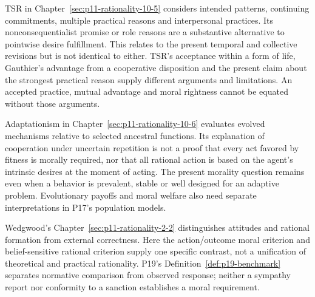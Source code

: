 TSR in Chapter~\ref{sec:p11-rationality-10-5} considers intended
patterns, continuing commitments, multiple practical reasons and
interpersonal practices. Its nonconsequentialist promise or role
reasons are a substantive alternative to pointwise desire fulfillment.
This relates to the present temporal and collective revisions but
is not identical to either. TSR's acceptance within a form of life,
Gauthier's advantage from a cooperative disposition and the present
claim about the strongest practical reason supply different
arguments and limitations. An accepted practice, mutual advantage
and moral rightness cannot be equated without those arguments.

Adaptationism in Chapter~\ref{sec:p11-rationality-10-6} evaluates
evolved mechanisms relative to selected ancestral functions. Its
explanation of cooperation under uncertain repetition is not a
proof that every act favored by fitness is morally required, nor
that all rational action is based on the agent's intrinsic desires
at the moment of acting. The present morality question remains
even when a behavior is prevalent, stable or well designed for
an adaptive problem. Evolutionary payoffs and moral welfare
also need separate interpretations in P17's population models.

Wedgwood's Chapter~\ref{sec:p11-rationality-2-2} distinguishes
attitudes and rational formation from external correctness.
Here the action/outcome moral criterion and belief-sensitive
rational criterion supply one specific contrast, not a unification
of theoretical and practical rationality. P19's
Definition~\ref{def:p19-benchmark} separates normative comparison
from observed response; neither a sympathy report nor conformity
to a sanction establishes a moral requirement.

